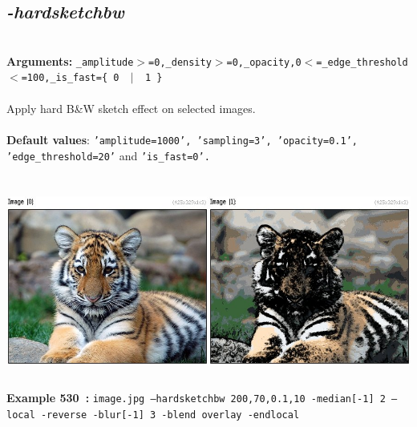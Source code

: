 \documentclass[a4paper,11pt,twoside]{book}
\begin{document}
\subsection{\emph{-hardsketchbw} }\vspace*{-0.5em}
~\\\textbf{Arguments: } 
{\small \texttt{\_amplitude$>$=0,\_density$>$=0,\_opacity,0$<$=\_edge\_threshold$<$=100,\_is\_fast=\{ 0 ~$|$~ 1 \}}}\\~\\
Apply hard B\&W sketch effect on selected images.
~\\~\\\textbf{Default values}: {\small \texttt{'amplitude=1000', 'sampling=3', 'opacity=0.1', 'edge\_threshold=20'} and \texttt{'is\_fast=0'.}}
\begin{center}\includegraphics[keepaspectratio=true,height=7cm,width=\textwidth]{img/gmic_def530.jpg}\\
{\footnotesize \textbf{Example 530~:} \texttt{image.jpg --hardsketchbw 200,70,0.1,10 -median[-1] 2 --local -reverse -blur[-1] 3 -blend overlay -endlocal}}
\end{center}
\end{document}
